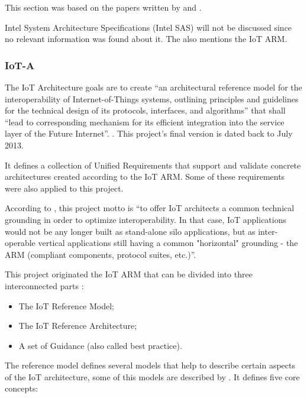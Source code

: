 This section was based on the papers written by \cite{Lynn2020} and \cite{DIAS2022100529}.

Intel System Architecture Specifications (Intel SAS) will not be discussed since no relevant information was found about it.
The  also mentions the \gls{IoT} \gls{ARM}.

\subsubsection{IoT-A}
\label{subsubsec:stateofart:arch:iota}

The IoT Architecture goals are to create ``an architectural reference model for the interoperability of Internet-of-Things systems, outlining principles and guidelines for the technical design of its protocols, interfaces, and algorithms'' that shall ``lead to corresponding mechanism for its efficient integration into the service layer of the Future Internet''. \parencite{iot-a}. This project's final version is dated back to July 2013.

It defines a collection of Unified Requirements that support and validate concrete architectures created according to the \gls{IoT} \gls{ARM}. Some of these requirements were also applied to this project.

According to \cite{krvco2014designing}, this project motto is ``to offer IoT architects a common technical grounding in order to optimize interoperability. In that case, IoT applications would not be any longer built as stand-alone silo applications, but as inter-operable vertical applications still having a common "horizontal" grounding - the \gls{ARM} (compliant components, protocol suites, etc.)''.

This project originated the \gls{IoT} \gls{ARM} that can be divided into three interconnected parts \parencite{krvco2014designing}:

\begin{itemize}
    \item The IoT Reference Model;
    \item The IoT Reference Architecture;
    \item A set of Guidance (also called best practice).
\end{itemize}

The reference model defines several models that help to describe certain aspects of the \gls{IoT} architecture, some of this models are described by \cite{6682101}. It defines five core concepts:

